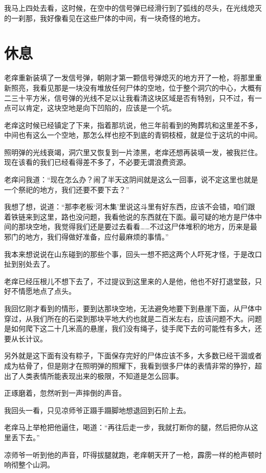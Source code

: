 我马上四处去看，这时候，在空中的信号弹已经滑行到了弧线的尽头，在光线熄灭的一刹那，我好像看见在这些尸体的中间，有一块奇怪的地方。

\chapter{休息}

老痒重新装填了一发信号弹，朝刚才第一颗信号弹熄灭的地方开了一枪，将那里重新照亮，我看见那是一块没有堆放任何尸体的空地，位于整个洞穴的中心，大概有二三十平方米，信号弹的光线不足以让我看清这块区域是否有特别，只不过，有一点可以肯定，这块空地是向下凹陷的，应该是一个坑。

老痒这时候已经镇定了下来，指着那坑说，他三年前看到的殉葬坑和这里差不多，中间也有这么一个空地，那怎么样也挖不到底的青铜枝桠，就是位于这坑的中间。

照明弹的光线衰竭，洞穴里又恢复到一片漆黑，老痒还想再装填一发，被我拦住。现在该看的我们已经看得差不多了，不必要无谓浪费资源。

老痒问我道：“现在怎么办？闹了半天这阴间就是这么一回事，说不定这里也就是一个祭祀的地方，我们还要不要下去？”

我想了想，说道：“那李老板‘河木集’里说这斗里有好东西，应该不会错，咱们跟着铁链来到这里，路也没问题，我看他说的东西就在下面。最可疑的地方是尸体中间的那块空地，我觉得我们还是要过去看看……不过这尸体堆积的地方，历来是最邪门的地方，我们得做好准备，应付最麻烦的事情。”

我本来想说说在山东碰到的那些个事，回头一想不把这两个人吓死才怪，于是改口扯到别处去了。

老痒已经压根儿不想下去了，不过提议到这里来的人是他，他也不好打退堂鼓，只好不情愿地点了点头。

我回忆刚才看到的情形，要到达那块空地，无法避免地要下到悬崖下面，从尸体中穿过，从我们所在的石梁到那块平地大约也就是二百米左右，应该问题不大。问题是如何爬下这二十几米高的悬崖，我们没有绳子，徒手爬下去的可能性有多大，还要从长计议。

另外就是这下面有没有粽子，下面保存完好的尸体应该不多，大多数已经干涸或者成为枯骨了，但是刚才在照明弹的照耀下，我看到很多尸体的表情非常的狰狞，超出了人类表情所能表现出来的极限，不知道是怎么回事。

正琢磨着，忽然听到一声摔倒的声音。

我回头一看，只见凉师爷正蹑手蹑脚地想退回到石阶上去。

老痒马上举枪把他逼住，喝道：“再往后走一步，我就打断你的腿，然后把你从这里丢下去。”

凉师爷一听到他的声音，吓得拔腿就跑，老痒朝天开了一枪，霹雳一样的枪声顿时响彻整个山洞。

